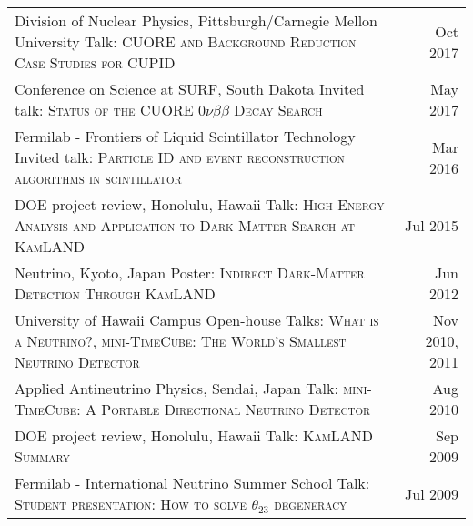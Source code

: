 \documentclass[10pt]{article} %
\begin{document}
\noindent\begin{tabularx}{\linewidth}{@{{}\textbullet\enskip}X@{\quad}r@{}}
	Division of Nuclear Physics, Pittsburgh/Carnegie Mellon University \newline Talk: \textsc{CUORE and Background Reduction Case Studies for CUPID} & Oct 2017 \\
	Conference on Science at SURF, South Dakota \newline Invited talk: \textsc{Status of the CUORE $0\nu\beta\beta$ Decay Search} & May 2017 \\
	Fermilab - Frontiers of Liquid Scintillator Technology \newline Invited talk: \textsc{Particle ID and event reconstruction algorithms in scintillator} & Mar 2016 \\
	DOE project review, Honolulu, Hawaii \newline Talk: \textsc{High Energy Analysis and Application to Dark Matter Search at KamLAND} & Jul 2015 \\
	Neutrino, Kyoto, Japan \newline Poster: \textsc{Indirect Dark-Matter Detection Through KamLAND} & Jun 2012 \\
	University of Hawaii Campus Open-house \newline Talks: \textsc{What is a Neutrino?}, \textsc{mini-TimeCube: The World's Smallest Neutrino Detector} & Nov 2010, 2011 \\
	Applied Antineutrino Physics, Sendai, Japan \newline Talk: \textsc{mini-TimeCube: A Portable Directional Neutrino Detector} & Aug 2010 \\
	DOE project review, Honolulu, Hawaii \newline Talk: \textsc{KamLAND Summary} & Sep 2009 \\
	Fermilab - International Neutrino Summer School \newline Talk: \textsc{Student presentation: How to solve $\theta_{23}$ degeneracy} & Jul 2009 \\
\end{tabularx}


\clearpage
\renewcommand\refname{Publications} %


\nocite{*} %
%
\printbibliography
\end{document}
